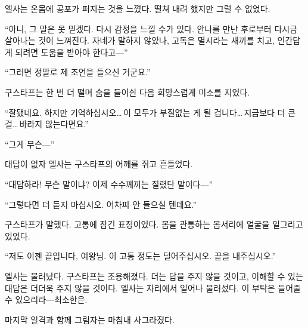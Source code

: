 엘사는 온몸에 공포가 퍼지는 것을 느꼈다. 떨쳐 내려 했지만 그럴 수 없었다.

``아니, 그 말은 못 믿겠다. 다시 감정을 느낄 수가 있다. 안나를 만난 후로부터 다시금 살아나는 것이 느껴진다. 자네가 말하지 않았나, 고독은 멸시라는 새끼를 치고, 인간답게 되려면 도움을 받아야 한다고—''

``그러면 정말로 제 조언을 들으신 거군요.''

구스타프는 한 번 더 떨며 숨을 들이쉰 다음 희망스럽게 미소를 지었다.

``잘됐네요. 하지만 기억하십시오\ldots\,이 모두가 부질없는 게 될 겁니다\ldots\,지금보다 더 큰 걸\ldots\,바라지 않는다면요.''

``그게 무슨—''

대답이 없자 엘사는 구스타프의 어깨를 쥐고 흔들었다.

``대답하라! 무슨 말이냐? 이제 수수께끼는 질렸단 말이다—''

``그렇다면 더 듣지 마십시오. 어차피 안 들으실 텐데요.''

구스타프가 말했다. 고통에 잠긴 표정이었다. 몸을 관통하는 몸서리에 얼굴을 일그리고 있었다.

``저도 이젠 끝입니다, 여왕님. 이 고통 정도는 덜어주십시오. 끝을 내주십시오.''

엘사는 물러났다. 구스타프는 조용해졌다. 더는 답을 주지 않을 것이고, 이해할 수 있는 대답은 더더욱 주지 않을 것이다. 엘사는 자리에서 일어나 물러섰다. 이 부탁은 들어줄 수 있으리라—최소한은.

마지막 일격과 함께 그림자는 마침내 사그라졌다.

